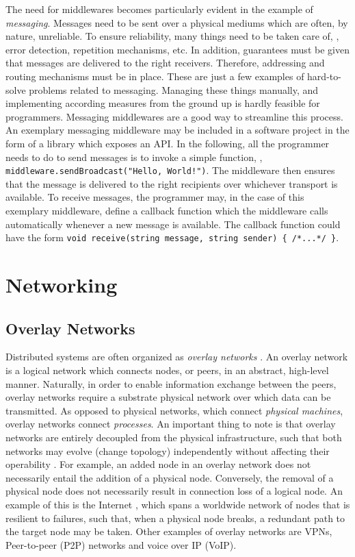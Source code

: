 The need for middlewares becomes particularly evident in the example of \emph{messaging}. Messages need to be sent over a physical mediums which are often, by nature, unreliable. To ensure reliability, many things need to be taken care of, \eg , error detection, repetition mechanisms, etc. In addition, guarantees must be given that messages are delivered to the right receivers. Therefore, addressing and routing mechanisms must be in place. These are just a few examples of hard-to-solve problems related to messaging. Managing these things manually, and implementing according measures from the ground up is hardly feasible for programmers. Messaging middlewares are a good way to streamline this process. An exemplary messaging middleware may be included in a software project in the form of a library which exposes an API. In the following, all the programmer needs to do to send messages is to invoke a simple function, \eg , \texttt{middleware.sendBroadcast("Hello, World!")}. The middleware then ensures that the message is delivered to the right recipients over whichever transport is available. To receive messages, the programmer may, in the case of this exemplary middleware, define a callback function which the middleware calls automatically whenever a new message is available. The callback function could have the form \texttt{void receive(string message, string sender) \{ /*...*/ \}}.

%
%
%
%
%
%
%
%
%
%

\section{Networking}

\subsection{Overlay Networks}
Distributed systems are often organized as \emph{overlay networks} \cite{tarkoma2010overlay}. An overlay network is a logical network which connects nodes, or peers, in an abstract, high-level manner. Naturally, in order to enable information exchange between the peers, overlay networks require a substrate physical network over which data can be transmitted. As opposed to physical networks, which connect \emph{physical machines}, overlay networks connect \emph{processes}. An important thing to note is that overlay networks are entirely decoupled from the physical infrastructure, such that both networks may evolve (change topology) independently without affecting their operability \cite{tanenbaum2017distributed}. For example, an added node in an overlay network does not necessarily entail the addition of a physical node. Conversely, the removal of a physical node does not necessarily result in connection loss of a logical node. An example of this is the Internet \cite{vaezi2017virtualization}, which spans a worldwide network of nodes that is resilient to failures, such that, when a physical node breaks, a redundant path to the target node may be taken. Other examples of overlay networks are VPNs, Peer-to-peer (P2P) networks and voice over IP (VoIP).

